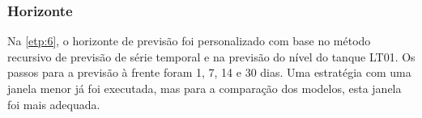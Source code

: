 \subsubsection{Horizonte}

Na \ref{etp:6}, o horizonte de previsão foi personalizado com base no método recursivo de previsão de série temporal e na previsão do nível do tanque LT01. Os passos para a previsão à frente foram 1, 7, 14 e 30 dias. Uma estratégia com uma janela menor já foi executada, mas para a comparação dos modelos, esta janela foi mais adequada.
